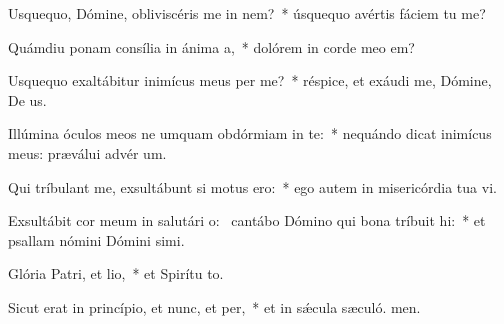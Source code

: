\item Usquequo, Dómine, obliviscéris me in nem?~* úsquequo avértis fáciem tu  me?
\item Quámdiu ponam consília in ánima a,~* dolórem in corde meo  em?
\item Usquequo exaltábitur inimícus meus per me?~* réspice, et exáudi me, Dómine, De us.
\item Illúmina óculos meos ne umquam obdórmiam in te:~* nequándo dicat inimícus meus: præválui advér um.
\item Qui tríbulant me, exsultábunt si motus ero:~* ego autem in misericórdia tua vi.
\item Exsultábit cor meum in salutári o:~\pscross{} cantábo Dómino qui bona tríbuit hi:~* et psallam nómini Dómini simi.
\item Glória Patri, et lio,~* et Spirítu to.
\item Sicut erat in princípio, et nunc, et per,~* et in sǽcula sæculó. men.
